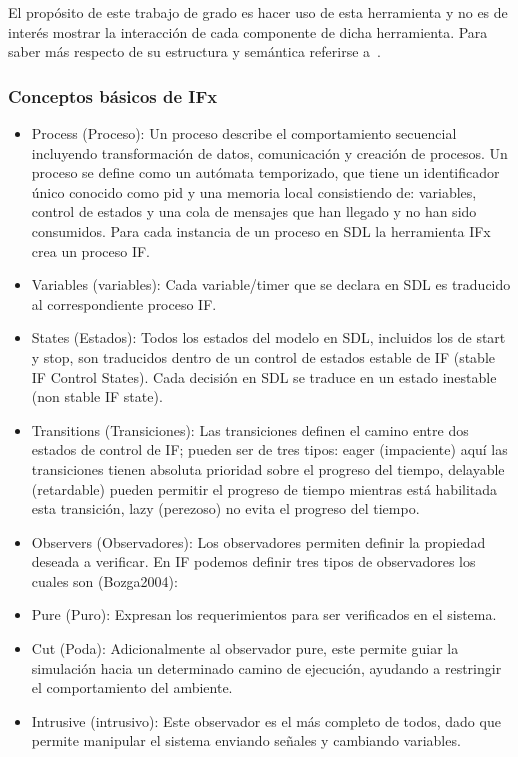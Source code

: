 El prop\'osito de este trabajo de grado es hacer uso de esta herramienta y no es 
de inter\'es mostrar la interacci\'on de cada componente de dicha herramienta. 
Para saber m\'as respecto de su estructura y sem\'antica referirse 
a~\cite{Bozga2004}.

\subsubsection{Conceptos b\'asicos de IFx}

\begin{itemize}
 \item Process (Proceso): Un proceso describe el comportamiento secuencial 
incluyendo transformaci\'on de datos, comunicaci\'on y creaci\'on de procesos. 
Un proceso se define como un aut\'omata temporizado, que tiene un identificador 
\'unico conocido como pid y una memoria local consistiendo de: variables, 
control de estados y una cola de mensajes que han llegado y no han sido 
consumidos. Para cada instancia de un proceso en SDL la herramienta IFx crea un 
proceso IF.
\item Variables (variables): Cada variable/timer que se declara en SDL es 
traducido al correspondiente proceso IF.
\item States (Estados): Todos los estados del modelo en SDL, incluidos los de 
start y stop, son traducidos dentro de un control de estados estable de IF 
(stable IF Control States). Cada decisi\'on en SDL se traduce en un estado 
inestable (non stable IF state).
\item Transitions (Transiciones): Las transiciones definen el camino entre dos 
estados de control de IF; pueden ser de tres tipos: eager (impaciente) aqu\'i 
las transiciones tienen absoluta prioridad sobre el progreso del tiempo, 
delayable (retardable) pueden permitir el progreso de tiempo mientras est\'a 
habilitada esta transici\'on, lazy (perezoso) no evita el progreso del tiempo.
 \item Observers (Observadores): Los observadores permiten definir la propiedad 
deseada a verificar. En IF podemos definir tres tipos de observadores los cuales 
son (Bozga2004):
\item Pure (Puro): Expresan los requerimientos para ser verificados en el 
sistema.
\item Cut (Poda): Adicionalmente al observador pure, este permite guiar la 
simulaci\'on hacia un determinado camino de ejecuci\'on, ayudando a restringir 
el comportamiento del ambiente.
\item Intrusive (intrusivo): Este observador es el m\'as completo de todos, 
dado que permite manipular el sistema enviando se\~nales y cambiando variables.
\end{itemize}

